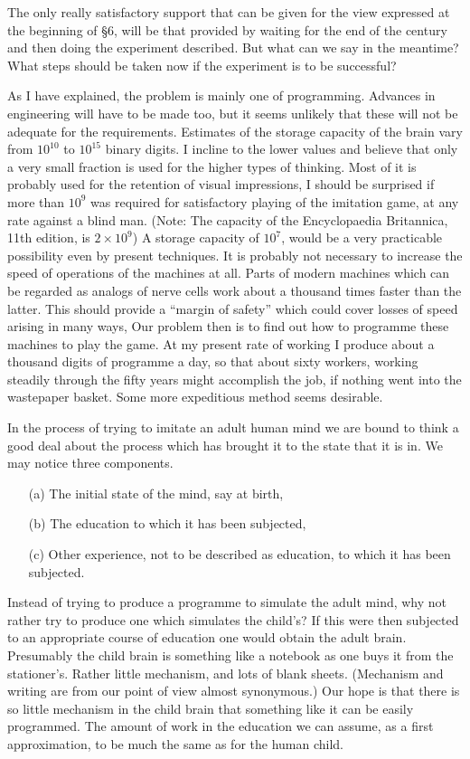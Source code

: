 \documentclass[10pt,twoside,openright]{memoir}
\begin{document}
The only really satisfactory support that can be given for the view expressed at the beginning of \S6, will be that provided by waiting for the end of the century and then doing the experiment described. But what can we say in the meantime? What steps should be taken now if the experiment is to be successful?

As I have explained, the problem is mainly one of programming. Advances in engineering will have to be made too, but it seems unlikely that these will not be adequate for the requirements. Estimates of the storage capacity of the brain vary from $10^{10}$ to $10^{15}$ binary digits. I incline to the lower values and believe that only a very small fraction is used for the higher types of thinking. Most of it is probably used for the retention of visual impressions, I should be surprised if more than $10^9$ was required for satisfactory playing of the imitation game, at any rate against a blind man. (Note: The capacity of the Encyclopaedia Britannica, 11th edition, is $2 \times 10^9$) A storage capacity of $10^7$, would be a very practicable possibility even by present techniques. It is probably not necessary to increase the speed of operations of the machines at all. Parts of modern machines which can be regarded as analogs of nerve cells work about a thousand times faster than the latter. This should provide a ``margin of safety'' which could cover losses of speed arising in many ways, Our problem then is to find out how to programme these machines to play the game. At my present rate of working I produce about a thousand digits of programme a day, so that about sixty workers, working steadily through the fifty years might accomplish the job, if nothing went into the wastepaper basket. Some more expeditious method seems desirable.

In the process of trying to imitate an adult human mind we are bound to think a good deal about the process which has brought it to the state that it is in. We may notice three components.

\begin{itemize}
\item[(a)] The initial state of the mind, say at birth,
\item[(b)] The education to which it has been subjected,
\item[(c)] Other experience, not to be described as education, to which it has been subjected.
\end{itemize}

Instead of trying to produce a programme to simulate the adult mind, why not rather try to produce one which simulates the child's? If this were then subjected to an appropriate course of education one would obtain the adult brain. Presumably the child brain is something like a notebook as one buys it from the stationer's. Rather little mechanism, and lots of blank sheets. (Mechanism and writing are from our point of view almost synonymous.) Our hope is that there is so little mechanism in the child brain that something like it can be easily programmed. The amount of work in the education we can assume, as a first approximation, to be much the same as for the human child.
\end{document}
